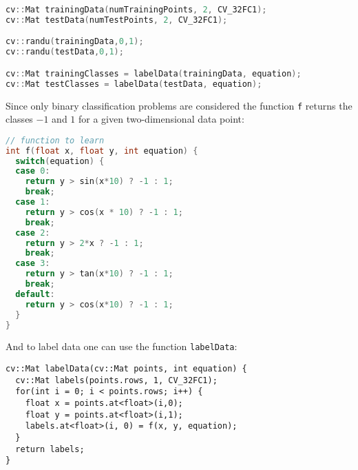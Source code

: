 \begin{lstlisting}[language=C++]
cv::Mat trainingData(numTrainingPoints, 2, CV_32FC1);
cv::Mat testData(numTestPoints, 2, CV_32FC1);

cv::randu(trainingData,0,1);
cv::randu(testData,0,1);

cv::Mat trainingClasses = labelData(trainingData, equation);
cv::Mat testClasses = labelData(testData, equation);
\end{lstlisting}

Since only binary classification problems are considered the function \lstinline|f| returns the classes $-1$ and $1$ for a given two-dimensional data point:

\begin{lstlisting}[language=C++]
// function to learn
int f(float x, float y, int equation) {
  switch(equation) {
  case 0:
    return y > sin(x*10) ? -1 : 1;
    break;
  case 1:
    return y > cos(x * 10) ? -1 : 1;
    break;
  case 2:
    return y > 2*x ? -1 : 1;
    break;
  case 3:
    return y > tan(x*10) ? -1 : 1;
    break;
  default:
    return y > cos(x*10) ? -1 : 1;
  }
}
\end{lstlisting}

And to label data one can use the function \lstinline|labelData|:
\begin{lstlisting}
cv::Mat labelData(cv::Mat points, int equation) {
  cv::Mat labels(points.rows, 1, CV_32FC1);
  for(int i = 0; i < points.rows; i++) {
    float x = points.at<float>(i,0);
    float y = points.at<float>(i,1);
    labels.at<float>(i, 0) = f(x, y, equation);
  }
  return labels;
}
\end{lstlisting}
